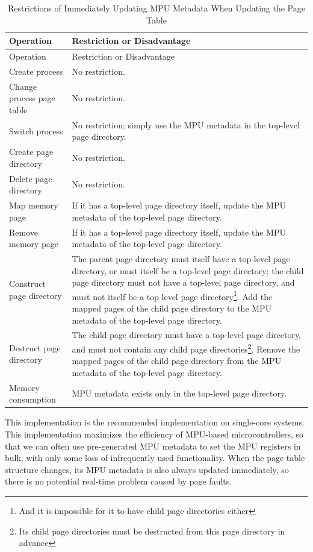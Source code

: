 \begin{xltabular}{\textwidth}{@{}>{\hsize\raggedright\arraybackslash}X>{\hsize\raggedright\arraybackslash}X@{}}
\caption{Restrictions of Immediately Updating MPU Metadata When Updating the Page Table}\label{tab:3-6-immediate-mpu-metadata-update-constraints}\\
\toprule
Operation & Restriction or Disadvantage\tabularnewline
\endfirsthead
\toprule
Operation & Restriction or Disadvantage\tabularnewline
\midrule
\endhead
\bottomrule
\endlastfoot
Create process & No restriction.\tabularnewline
Change process page table & No restriction.\tabularnewline
Switch process & No restriction; simply use the MPU metadata in the top-level page directory.\tabularnewline
Create page directory & No restriction.\tabularnewline
Delete page directory & No restriction.\tabularnewline
Map memory page &
If it has a top-level page directory itself, update the MPU metadata of the top-level page directory.\tabularnewline
Remove memory page &
If it has a top-level page directory itself, update the MPU metadata of the top-level page directory.\tabularnewline
Construct page directory &
The parent page directory must itself have a top-level page directory, or must itself be a top-level page directory; the child page directory must not have a top-level page directory, and must not itself be a top-level page directory\footnote{And it is impossible for it to have child page directories either}. Add the mapped pages of the child page directory to the MPU metadata of the top-level page directory.\tabularnewline
Destruct page directory &
The child page directory must have a top-level page directory, and must not contain any child page directories\footnote{Its child page directories must be destructed from this page directory in advance}. Remove the mapped pages of the child page directory from the MPU metadata of the top-level page directory.\tabularnewline
Memory consumption & MPU metadata exists only in the top-level page directory.\tabularnewline
\end{xltabular}
\nopagebreak[4]

This implementation is the recommended implementation on single-core systems. This implementation maximizes the efficiency of MPU-based microcontrollers, so that we can often use pre-generated MPU metadata to set the MPU registers in bulk, with only some loss of infrequently used functionality. When the page table structure changes, its MPU metadata is also always updated immediately, so there is no potential real-time problem caused by page faults.

